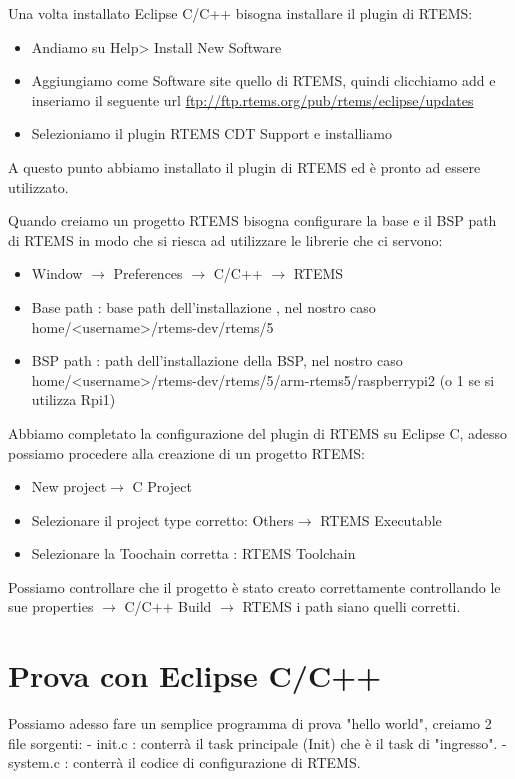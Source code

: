 \documentclass[10pt, a4paper]{article}
\begin{document}
\begin{flushleft}
Una volta installato Eclipse C/C++ bisogna installare il plugin di RTEMS:
\begin{itemize}
\item Andiamo su Help> Install New Software
\item Aggiungiamo come Software site quello di RTEMS, quindi clicchiamo add e inseriamo il seguente url \url{ftp://ftp.rtems.org/pub/rtems/eclipse/updates}
\item Selezioniamo il plugin RTEMS CDT Support e installiamo
\end{itemize}

A questo punto abbiamo installato il plugin di RTEMS ed è pronto ad essere utilizzato.

Quando creiamo un progetto RTEMS bisogna configurare la base e il BSP path di RTEMS in modo che si riesca ad utilizzare le librerie che ci servono:
\begin{itemize}
\item Window $\rightarrow$ Preferences $\rightarrow$ C/C++ $\rightarrow$ RTEMS
\item Base path : base path dell'installazione , nel nostro caso home/<username>/rtems-dev/rtems/5
\item BSP path : path dell'installazione della BSP, nel nostro caso home/<username>/rtems-dev/rtems/5/arm-rtems5/raspberrypi2 (o 1 se si utilizza Rpi1)
\end{itemize}

Abbiamo completato la configurazione del plugin di RTEMS su Eclipse C, adesso possiamo procedere alla creazione di un progetto RTEMS:
\begin{itemize}
\item New project$\rightarrow$ C Project
\item Selezionare il project type corretto: Others$\rightarrow$ RTEMS Executable
\item Selezionare la Toochain corretta : RTEMS Toolchain
\end{itemize}

Possiamo controllare che il progetto è stato creato correttamente controllando le sue properties $\rightarrow$ C/C++ Build $\rightarrow$ RTEMS i path siano quelli corretti.

\newpage
\section{Prova con Eclipse C/C++}

Possiamo adesso fare un semplice programma di prova "hello world",
creiamo 2 file sorgenti:
- init.c : conterrà il task principale (Init) che è il task di "ingresso".
- system.c : conterrà il codice di configurazione di RTEMS.


\end{flushleft}
\end{document}
